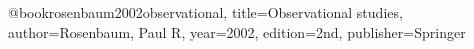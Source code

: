 @book{rosenbaum2002observational,
  title={Observational studies},
  author={Rosenbaum, Paul R},
  year={2002},
  edition={2nd},
  publisher={Springer}
}



%
%
